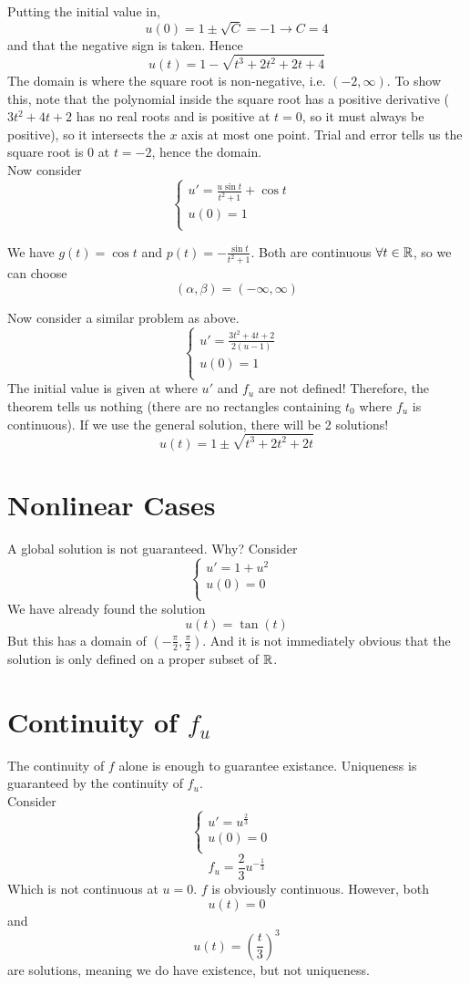\documentclass[12pt]{article}
\begin{document}
Putting the initial value in,
$$u(0) = 1 \pm \sqrt{C} = -1 \rightarrow C = 4$$
and that the negative sign is taken. Hence
$$u(t) = 1 - \sqrt{t^3 + 2t^2 + 2t + 4}$$
The domain is where the square root is non-negative, i.e. $(-2, \infty)$. To show this, note that the polynomial inside the square root has a positive derivative ($3t^2 + 4t + 2$ has no real roots and is positive at $t=0$, so it must always be positive), so it intersects the $x$ axis at most one point. Trial and error tells us the square root is 0 at $t = -2$, hence the domain. \\
Now consider
$$\begin{cases} u' = \frac{u\sin t}{t^2 + 1} + \cos t & \\ u(0) = 1 & \\ \end{cases}$$

We have $g(t) = \cos t$ and $p(t) = -\frac{\sin t}{t^2 + 1}$. Both are continuous $\forall t \in \mathbb{R}$, so we can choose
$$(\alpha, \beta) = (-\infty, \infty)$$

Now consider a similar problem as above.
$$\begin{cases} u' = \frac{3t^2 + 4t + 2}{2(u - 1)} & \\ u(0) = 1 & \\ \end{cases}$$
The initial value is given at where $u'$ and $f_u$ are not defined! Therefore, the theorem tells us nothing (there are no rectangles containing $t_0$ where $f_u$ is continuous). If we use the general solution, there will be 2 solutions!
$$u(t) = 1 \pm \sqrt{t^3 + 2t^2 + 2t}$$

\section{Nonlinear Cases}
A global solution is not guaranteed. Why? Consider
$$\begin{cases} u' = 1 + u^2 & \\ u(0) = 0 & \\ \end{cases}$$
We have already found the solution $$u(t) = \tan(t)$$
But this has a domain of $\left(-\frac{\pi}{2}, \frac{\pi}{2}\right)$. And it is not immediately obvious that the solution is only defined on a proper subset of $\mathbb{R}$.

\section{Continuity of $f_u$}
The continuity of $f$ alone is enough to guarantee existance. Uniqueness is guaranteed by the continuity of $f_u$. \\
Consider
$$\begin{cases} u' = u^{\frac{2}{3}} & \\ u(0) = 0 & \\ \end{cases}$$
$$f_u = \frac{2}{3}u^{-\frac{1}{3}}$$
Which is not continuous at $u = 0$. $f$ is obviously continuous. However, both
$$u(t) = 0$$
and
$$u(t) = \left(\frac{t}{3}\right)^3$$
are solutions, meaning we do have existence, but not uniqueness.
\end{document}
